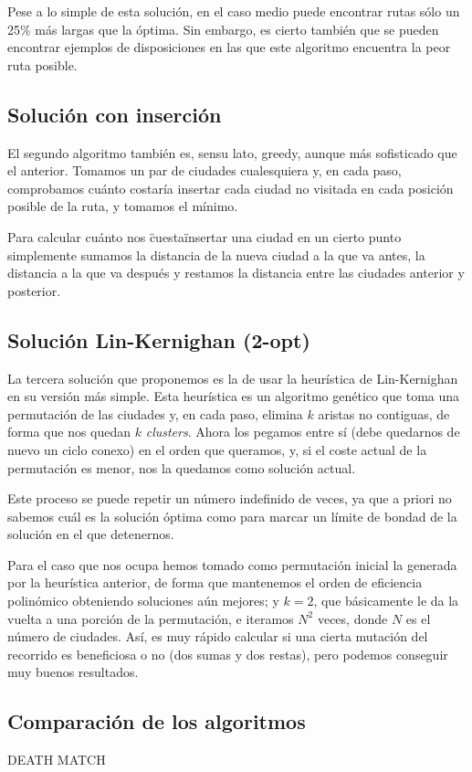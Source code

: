 \documentclass[a4paper, 11pt]{article}
\begin{document}
Pese a lo simple de esta solución, en el caso medio puede encontrar rutas sólo un 25\% más largas que la óptima. Sin embargo, es cierto también que se pueden encontrar ejemplos de disposiciones en las que este algoritmo encuentra la peor ruta posible.

\subsection{Solución con inserción}
El segundo algoritmo también es, sensu lato, greedy, aunque más sofisticado que el anterior. Tomamos un par de ciudades cualesquiera y, en cada paso, comprobamos cuánto costaría insertar cada ciudad no visitada en cada posición posible de la ruta, y tomamos el mínimo. 

Para calcular cuánto nos \"cuesta\" insertar una ciudad en un cierto punto simplemente sumamos la distancia de la nueva ciudad a la que va antes, la distancia a la que va después y restamos la distancia entre las ciudades anterior y posterior.

\subsection{Solución Lin-Kernighan (2-opt)}
La tercera solución que proponemos es la de usar la heurística de Lin-Kernighan en su versión más simple. Esta heurística es un algoritmo genético que toma una permutación de las ciudades y, en cada paso, elimina $k$ aristas no contiguas, de forma que nos quedan $k$ \textit{clusters}. Ahora los pegamos entre sí (debe quedarnos de nuevo un ciclo conexo) en el orden que queramos, y, si el coste actual de la permutación es menor, nos la quedamos como solución actual.

Este proceso se puede repetir un número indefinido de veces, ya que a priori no sabemos cuál es la solución óptima como para marcar un límite de bondad de la solución en el que detenernos.

Para el caso que nos ocupa hemos tomado como permutación inicial la generada por la heurística anterior, de forma que mantenemos el orden de eficiencia polinómico obteniendo soluciones aún mejores; y $k=2$, que básicamente le da la vuelta a una porción de la permutación, e iteramos $N^2$ veces, donde $N$ es el número de ciudades. Así, es muy rápido calcular si una cierta mutación del recorrido es beneficiosa o no (dos sumas y dos restas), pero podemos conseguir muy buenos resultados.

\subsection{Comparación de los algoritmos}

DEATH MATCH
\end{document}
